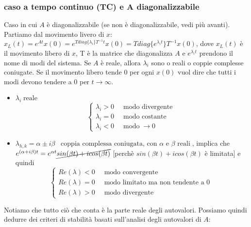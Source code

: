\subsubsection*{caso a tempo continuo (TC) e A diagonalizzabile}
Caso in cui $A$ è diagonalizzabile (se non è diagonalizzabile, vedi più avanti).\newline
\newline
Partiamo dal movimento livero di $x$: $x_L (t) = e^{At} x(0) = e^{T diag\{\lambda_i\}T^{-1} t}x(0) = T diag\{e^{\lambda_i t}\}T^{-1}x(0)$, dove $x_L(t)$ è il movimento libero di $x$, T è la matrice che diagonalizza $A$ e $e^{\lambda_it}$ prendono il nome di modi del sistema.\newline
\newline
Se $A$ è reale, allora $\lambda_i$ sono o reali o coppie complesse coniugate.\newline
\newline
Se il movimento libero tende $0$ per ogni $x(0)$ vuol dire che tutti i modi devono tendere a $0$ per $t \rightarrow \infty$.
\begin{itemize}
    \item $\lambda_i \; \text{reale}$
    \[
        \begin{cases}
            \lambda_i >0 \;\;& \text{modo divergente}\;\\
            \lambda_i =0 \;\;& \text{modo costante}\;\\
            \lambda_i <0 \;\;& \text{modo}\;\rightarrow  0
        \end{cases}
    \]
    \item $\lambda_{h,k} = \alpha \pm i \beta \;\;\;\text{coppia complessa coniugata, con $\alpha$ e $\beta$ reali}\;$, implica che $e^{(\alpha + i \beta)t} = e^{\alpha t} \cancel{sin(\beta t) + i cos(\beta t)}$ [perchè $sin(\beta t) + i cos(\beta t)$ è limitata] e quindi
    \[
        \begin{cases}
            Re(\lambda) < 0 \;\; & \text{modo convergente}\;\\
            Re(\lambda) = 0 \;\; & \text{modo limitato ma non tendente a $0$}\;\\
            Re(\lambda) > 0 \;\; & \text{modo divergente}\;
        \end{cases}
    \]
\end{itemize}
Notiamo che tutto ciò che conta è la parte reale degli autovalori.\newline
\newline
Possiamo quindi dedurre dei criteri di stabilità basati sull'analisi degli autovalori di $A$:
